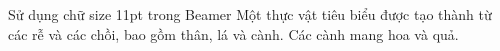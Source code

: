 \documentclass[11pt]{beamer}
\begin{document}
	\begin{frame}{Sử dụng chữ size 11pt trong Beamer}
		\justifying
		Một thực vật tiêu biểu được tạo thành từ các rễ và các chồi, bao gồm thân, lá và cành. Các cành mang hoa và quả.
	\end{frame}
\end{document}
